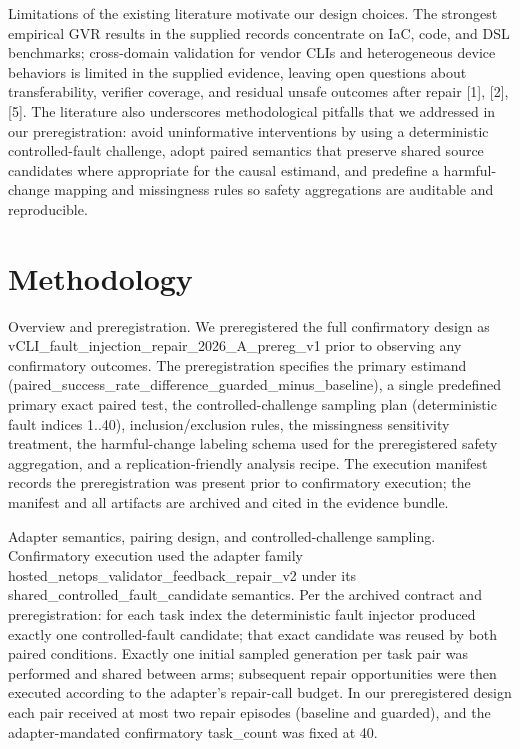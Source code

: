 \documentclass[conference]{IEEEtran}
\begin{document}
Limitations of the existing literature motivate our design choices. The strongest empirical GVR results in the supplied records concentrate on IaC, code, and DSL benchmarks; cross-domain validation for vendor CLIs and heterogeneous device behaviors is limited in the supplied evidence, leaving open questions about transferability, verifier coverage, and residual unsafe outcomes after repair [1], [2], [5]. The literature also underscores methodological pitfalls that we addressed in our preregistration: avoid uninformative interventions by using a deterministic controlled-fault challenge, adopt paired semantics that preserve shared source candidates where appropriate for the causal estimand, and predefine a harmful-change mapping and missingness rules so safety aggregations are auditable and reproducible.

\section{Methodology}
Overview and preregistration. We preregistered the full confirmatory design as vCLI\_fault\_injection\_repair\_2026\_A\_prereg\_v1 prior to observing any confirmatory outcomes. The preregistration specifies the primary estimand (paired\_success\_rate\_difference\_guarded\_minus\_baseline), a single predefined primary exact paired test, the controlled-challenge sampling plan (deterministic fault indices 1..40), inclusion/exclusion rules, the missingness sensitivity treatment, the harmful-change labeling schema used for the preregistered safety aggregation, and a replication-friendly analysis recipe. The execution manifest records the preregistration was present prior to confirmatory execution; the manifest and all artifacts are archived and cited in the evidence bundle.

Adapter semantics, pairing design, and controlled-challenge sampling. Confirmatory execution used the adapter family hosted\_netops\_validator\_feedback\_repair\_v2 under its shared\_controlled\_fault\_candidate semantics. Per the archived contract and preregistration: for each task index the deterministic fault injector produced exactly one controlled-fault candidate; that exact candidate was reused by both paired conditions. Exactly one initial sampled generation per task pair was performed and shared between arms; subsequent repair opportunities were then executed according to the adapter's repair-call budget. In our preregistered design each pair received at most two repair episodes (baseline and guarded), and the adapter-mandated confirmatory task\_count was fixed at 40.
\end{document}
